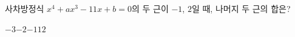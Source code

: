 사차방정식 $x^4+ax^3-11x+b=0$의 두 근이 $-1$, $2$일 때, 나머지 두 근의 합은? 
\begin{choices32}{$-3$}{$-2$}{$-1$}{$1$}{$2$}\end{choices32}
